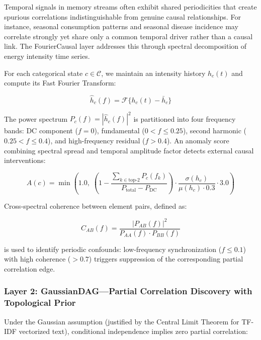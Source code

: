 \documentclass[11pt,a4paper]{article}
\begin{document}
Temporal signals in memory streams often exhibit shared periodicities that create spurious correlations indistinguishable from genuine causal relationships. For instance, seasonal consumption patterns and seasonal disease incidence may correlate strongly yet share only a common temporal driver rather than a causal link. The FourierCausal layer addresses this through spectral decomposition of energy intensity time series.

For each categorical state \(c \in \mathcal{C}\), we maintain an intensity history \(h_c(t)\) and compute its Fast Fourier Transform:

\begin{equation}
\hat{h}_c(f) = \mathcal{F}\{h_c(t) - \bar{h}_c\}
\label{eq:fft}
\end{equation}

The power spectrum \(P_c(f) = |\hat{h}_c(f)|^2\) is partitioned into four frequency bands: DC component (\(f = 0\)), fundamental (\(0 < f \leq 0.25\)), second harmonic (\(0.25 < f \leq 0.4\)), and high-frequency residual (\(f > 0.4\)). An anomaly score combining spectral spread and temporal amplitude factor detects external causal interventions:

\begin{equation}
A(c) = \min\left(1.0, \; \left(1 - \frac{\sum_{k \in \text{top-2}} P_c(f_k)}{P_{\text{total}} - P_{\text{DC}}}\right) \cdot \frac{\sigma(h_c)}{\mu(h_c) \cdot 0.3} \cdot 3.0\right)
\label{eq:anomaly}
\end{equation}

Cross-spectral coherence between element pairs, defined as:

\begin{equation}
C_{AB}(f) = \frac{|P_{AB}(f)|^2}{P_{AA}(f) \cdot P_{BB}(f)}
\label{eq:coherence}
\end{equation}

is used to identify periodic confounds: low-frequency synchronization (\(f \leq 0.1\)) with high coherence (\(>0.7\)) triggers suppression of the corresponding partial correlation edge.

\subsubsection{Layer 2: GaussianDAG---Partial Correlation Discovery with Topological Prior}

Under the Gaussian assumption (justified by the Central Limit Theorem for TF-IDF vectorized text), conditional independence implies zero partial correlation:
\end{document}
